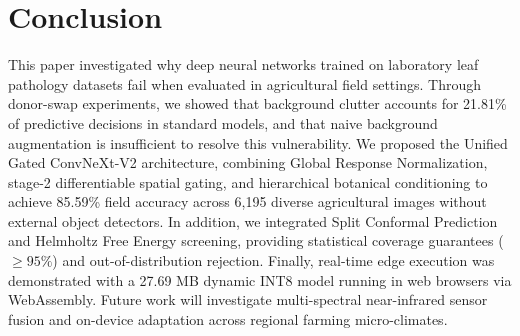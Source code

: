 \documentclass[conference]{IEEEtran}
\begin{document}
\balance

\section{Conclusion}
This paper investigated why deep neural networks trained on laboratory leaf pathology datasets fail when evaluated in agricultural field settings. Through donor-swap experiments, we showed that background clutter accounts for 21.81\% of predictive decisions in standard models, and that naive background augmentation is insufficient to resolve this vulnerability. We proposed the Unified Gated ConvNeXt-V2 architecture, combining Global Response Normalization, stage-2 differentiable spatial gating, and hierarchical botanical conditioning to achieve 85.59\% field accuracy across 6,195 diverse agricultural images without external object detectors. In addition, we integrated Split Conformal Prediction and Helmholtz Free Energy screening, providing statistical coverage guarantees ($\ge 95\%$) and out-of-distribution rejection. Finally, real-time edge execution was demonstrated with a 27.69 MB dynamic INT8 model running in web browsers via WebAssembly. Future work will investigate multi-spectral near-infrared sensor fusion and on-device adaptation across regional farming micro-climates.
\end{document}
